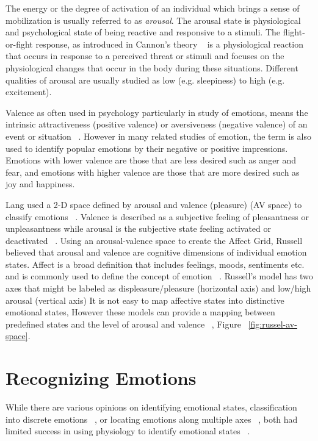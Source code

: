 The energy or the degree of activation of an individual which brings a sense of mobilization is usually referred to as \textit{arousal}. The arousal state is physiological and psychological state of being reactive and responsive to a stimuli. The flight-or-fight response, as introduced in Cannon's theory ~\cite{stern2001psychophysiological} is a physiological reaction that occurs in response to a perceived threat or stimuli and focuses on the physiological changes that occur in the body during these situations. Different qualities of arousal are usually studied as low (e.g. sleepiness) to high (e.g. excitement).

Valence as often used in psychology particularly in study of emotions, means the intrinsic attractiveness (positive valence) or aversiveness (negative valence) of an event or situation ~\cite{frijda1986emotions}. However in many related studies of emotion, the term is also used to identify popular emotions by their negative or positive impressions. Emotions with lower valence are those that are less desired such as anger and fear, and emotions with higher valence are those that are more desired such as joy and happiness.

Lang used a 2-D space defined by arousal and valence (pleasure) (AV space) to classify emotions ~\cite{lang1995emotion}. Valence is described as a subjective feeling of pleasantness or unpleasantness while arousal is the subjective state feeling activated or deactivated ~\cite{barrett1998discrete}. Using an arousal-valence space to create the Affect Grid, Russell believed that arousal and valence are cognitive dimensions of individual emotion states. Affect is a broad definition that includes feelings, moods, sentiments etc. and is commonly used to define the concept of emotion ~\cite{picard2003affective}. Russell's model has two axes that might be labeled as displeasure/pleasure (horizontal axis) and low/high arousal (vertical axis) It is not easy to map affective states into distinctive emotional states, However these models can provide a mapping between predefined states and the level of arousal and valence ~\cite{zagalo2004story}, Figure ~\ref{fig:russel-av-space}.

\section{Recognizing Emotions}

While there are various opinions on identifying emotional states, classification into discrete emotions ~\cite{dalgleish1999handbook}, or locating emotions along multiple axes ~\cite{russell1989affect, lang1995emotion}, both had limited success in using physiology to identify emotional states ~\cite{cacioppo2000psychophysiology}.

